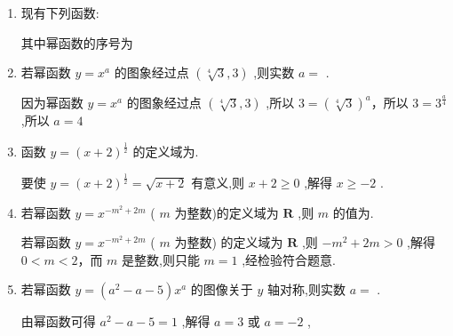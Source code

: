 \begin{enumerate}
\begin{jieda}
        所以 ${\alpha }_{1},{\alpha }_{2},{\alpha }_{3}$ 依次可以是 $- 1,\dfrac{1}{2},3$ .
    \end{jieda}
    \item 现有下列函数: 
    其中幂函数的序号为
    \item 若幂函数 $y = {x}^{a}$ 的图象经过点 $\left( {\sqrt[4]{3},3}\right)$ ,则实数 $a =$ .
    \begin{jieda}
        因为幂函数 $y = {x}^{a}$ 的图象经过点 $\left( {\sqrt[4]{3},3}\right)$ ,所以 $3 = {\left( \sqrt[4]{3}\right) }^{a}$，所以 $3 = {3}^{\frac{a}{4}}$ ,所以 $a = 4$
    \end{jieda} 
    \item 函数 $y = {\left( x + 2\right) }^{\frac{1}{2}}$ 的定义域为.
    \begin{jieda}
        要使 $y = {\left( x + 2\right) }^{\frac{1}{2}} = \sqrt{x + 2}$ 有意义,则 $x + 2 \geq  0$ ,解得 $x \geq   - 2$ .
    \end{jieda}
    \item 若幂函数 $y = {x}^{-{m}^{2} + {2m}}$ ( $m$ 为整数)的定义域为 $\mathbf{R}$ ,则 $m$ 的值为.
    \begin{jieda}
        若幂函数 $y = {x}^{-{m}^{2} + {2m}}$ ( $m$ 为整数) 的定义域为 $\mathbf{R}$ ,则 $- {m}^{2} + {2m} > 0$ ,解得$0 < m < 2$，而 $m$ 是整数,则只能 $m = 1$ ,经检验符合题意.
    \end{jieda}
    \item 若幂函数 $y = \left( {{a}^{2} - a - 5}\right) {x}^{a}$ 的图像关于 $y$ 轴对称,则实数 $a =$ .
    \begin{jieda}
        由幂函数可得 ${a}^{2} - a - 5 = 1$ ,解得 $a = 3$ 或 $a =  - 2$ ,
        

\end{jieda}
\end{enumerate}
